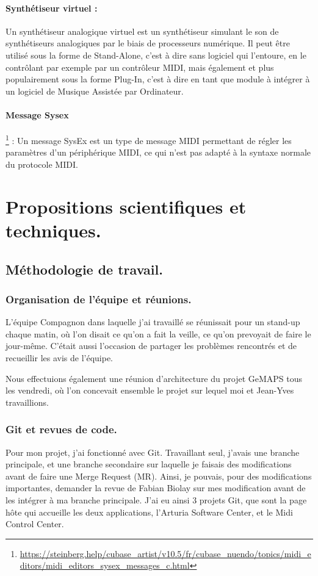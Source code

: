 \documentclass[francais]{rapportPFE}  %
\begin{document}
\paragraph{Synthétiseur virtuel :} Un synthétiseur analogique virtuel est un synthétiseur simulant le son de synthétiseurs analogiques par le biais de processeurs numérique. Il peut être utilisé sous la forme de Stand-Alone, c'est à dire sans logiciel qui l'entoure, en le contrôlant par exemple par un contrôleur MIDI, mais également et plus populairement sous la forme Plug-In, c'est à dire en tant que module à intégrer à un logiciel de Musique Assistée par Ordinateur.
\paragraph{Message Sysex}
\footnote{\url{https://steinberg.help/cubase_artist/v10.5/fr/cubase_nuendo/topics/midi_editors/midi_editors_sysex_messages_c.html}}
: Un message SysEx est un type de message MIDI permettant de régler les paramètres d'un périphérique MIDI, ce qui n'est pas adapté à la syntaxe normale du protocole MIDI. 


\section{Propositions scientifiques et techniques.}
\subsection{Méthodologie de travail.}
\subsubsection{Organisation de l'équipe et réunions.}
L'équipe Compagnon dans laquelle j'ai travaillé se réunissait pour un stand-up chaque matin, où l'on disait ce qu'on a fait la veille, ce qu'on prevoyait de faire le jour-même. C'était aussi l'occasion de partager les problèmes rencontrés et de recueillir les avis de l'équipe.

Nous effectuions également une réunion d'architecture du projet GeMAPS tous les vendredi, où l'on concevait ensemble le projet sur lequel moi et Jean-Yves travaillions. 


\subsubsection{Git et revues de code.}
Pour mon projet, j'ai fonctionné avec Git. Travaillant seul, j'avais une branche principale, et une branche secondaire sur laquelle je faisais des modifications avant de faire une Merge Request (MR). Ainsi, je pouvais, pour des modifications importantes, demander la revue de Fabian Biolay sur mes modification avant de les intégrer à ma branche principale. J'ai eu ainsi 3 projets Git, que sont la page hôte qui accueille les deux applications, l'Arturia Software Center, et le Midi Control Center.
\end{document}
